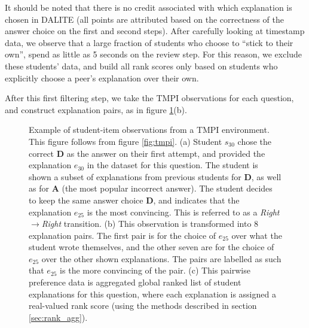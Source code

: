 \documentclass[notitlepage,12pt]{jedm}
\begin{document}
It should be noted that there is no credit associated with which explanation is 
chosen in DALITE (all points are attributed based on the  correctness of the 
answer choice on the first and second steps).
After carefully looking at timestamp data, we observe that a large fraction of 
students who choose to ``stick to their own'', spend as little as 5 seconds on 
the review step.
For this reason, we exclude these students' data, and build all rank scores 
only based on students who explicitly choose a peer's explanation over their 
own.

After this first filtering step, we take the TMPI observations for each 
question, and construct explanation pairs, as in figure 
\ref{fig:make_pairs_a}(b).

\begin{figure}[H]
	\centering
	\def\svgscale{0.40}
	
	\caption{
	Example of student-item observations from a TMPI environment. 
	This figure follows from figure \protect\ref{fig:tmpi}.
	(a) Student $s_{30}$ chose the correct \textbf{D} as the answer on 
	their first attempt, and provided the explanation $e_{30}$ in the 
	dataset for this question. 
	The student is shown a subset of explanations from previous students for 
	\textbf{D}, as well as for \textbf{A} (the most popular incorrect 
	answer). 
	The student decides to keep the same answer choice \textbf{D}, and 
	indicates that the explanation $e_{25}$ is the most convincing.
	This is referred to as a \textit{Right}$\rightarrow$\textit{Right} 
	transition.
	(b) This observation is transformed into 8 explanation pairs. The first 
	pair is for the choice of $e_{25}$ over what the student wrote themselves, 
	and the other seven are for the choice of $e_{25}$ over the other shown 
	explanations. 
	The pairs are labelled as such that $e_{25}$ is the more convincing of the 
	pair. 
	(c) This pairwise preference data is aggregated global ranked list of 
	student explanations for this question, where each explanation is assigned 
	a real-valued rank score (using the methods described in section 
	\protect\ref{sec:rank_agg}).
}
\label{fig:make_pairs_a}
\end{figure}
\end{document}
